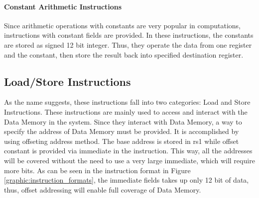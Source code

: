 \paragraph*{Constant Arithmetic Instructions}
Since arithmetic operations with constants are very popular in computations, instructions with
constant fields are provided. In these instructions, the constants are stored as signed 12 bit integer.
Thus, they operate the data from one register and the constant, then store the result back into
specified destination register.
\begin{table}[!h]
    \centering
    \caption{Constant/Immediate Arithmetic Instructions}
    \label{table:constant_arithmetic_instructions}
\end{table}

\newpage
\subsection{Load/Store Instructions}
As the name suggests, these instructions fall into two categories: Load and Store Instructions.
These instructions are mainly used to access and interact with the Data Memory in the system.
Since they interact with Data Memory, a way to specify the address of Data Memory must be provided.
It is accomplished by using offseting address method. The base address is stored in rs1 while offset constant
is provided via immediate in the instruction. This way, all the addresses will be covered without the need to
use a very large immediate, which will require more bits. As can be seen in the instruction format in
Figure \ref{graphic:instruction_formats}, the immediate fields takes up only 12 bit of data, thus, offset
addressing will enable full coverage of Data Memory.

